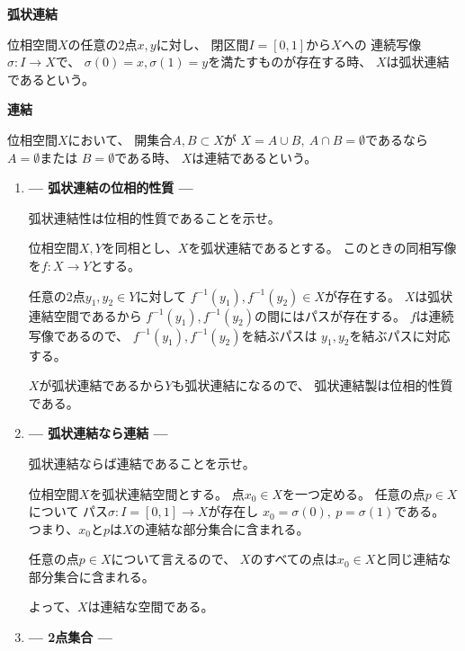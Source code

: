 \documentclass[12pt,b5paper]{ltjsarticle}
\begin{document}
\hrulefill

\textbf{弧状連結}

位相空間$X$の任意の2点$x,y$に対し、
閉区間$I=[0,1]$から$X$への
連続写像$\sigma:I\to X$で、
$\sigma(0)=x,\sigma(1)=y$を満たすものが存在する時、
$X$は弧状連結であるという。

\dotfill

\textbf{連結}

位相空間$X$において、
開集合$A,B\subset X$が
$X=A\cup B,\ A\cap B=\emptyset$であるなら
$A=\emptyset$または
$B=\emptyset$である時、
$X$は連結であるという。

\hrulefill

\begin{enumerate}
 \item \textbf{--- 弧状連結の位相的性質 ---}

       弧状連結性は位相的性質であることを示せ。

       \dotfill

       位相空間$X,Y$を同相とし、$X$を弧状連結であるとする。
       このときの同相写像を$f:X\to Y$とする。

       任意の2点$y_1,y_2\in Y$に対して
       $f^{-1}(y_1),f^{-1}(y_2)\in X$が存在する。
       $X$は弧状連結空間であるから
       $f^{-1}(y_1),f^{-1}(y_2)$の間にはパスが存在する。
       $f$は連続写像であるので、
       $f^{-1}(y_1),f^{-1}(y_2)$を結ぶパスは
       $y_1,y_2$を結ぶパスに対応する。

       $X$が弧状連結であるから$Y$も弧状連結になるので、
       弧状連結製は位相的性質である。

       \hrulefill

 \item \textbf{--- 弧状連結なら連結 ---}

       弧状連結ならば連結であることを示せ。

       \dotfill

       位相空間$X$を弧状連結空間とする。
       点$x_0\in X$を一つ定める。
       任意の点$p\in X$について
       パス$\sigma:I=[0,1]\to X$が存在し
       $x_0=\sigma(0),\ p=\sigma(1)$である。
       つまり、$x_0$と$p$は$X$の連結な部分集合に含まれる。

       任意の点$p\in X$について言えるので、
       $X$のすべての点は$x_0\in X$と同じ連結な部分集合に含まれる。

       よって、$X$は連結な空間である。

       \hrulefill

\newpage

 \item \textbf{--- 2点集合 ---}


\end{enumerate}
\end{document}
